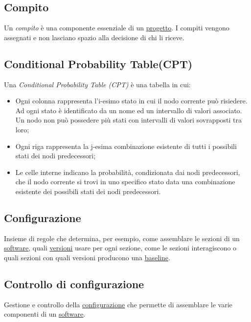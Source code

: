 	
	\subsection{Compito}
	\label{sec:compito}
	Un \emph{compito} è una componente essenziale di un \underline{\hyperref[sec:progetto]{progetto}}. I compiti vengono assegnati e non lasciano spazio alla decisione di chi li riceve.

	
	\subsection{Conditional Probability Table(CPT)}
	\label{sec:CPT}
	Una \emph{Conditional Probability Table (CPT)} è una tabella in cui:
		\begin{itemize}
			\item{Ogni colonna rappresenta l'i-esimo stato in cui il nodo corrente può risiedere. Ad ogni stato è identificato da un nome ed un intervallo di valori associato. Un nodo non può possedere più stati con intervalli di valori sovrapposti tra loro;}
			\item{Ogni riga rappresenta la j-esima combinazione esistente di tutti i possibili stati dei nodi predecessori;}
			\item{Le celle interne indicano la probabilità, condizionata dai nodi predecessori, che il nodo corrente si trovi in uno specifico stato data una combinazione esistente dei possibili stati dei nodi predecessori.}
		\end{itemize}

	
	\subsection{Configurazione}
	\label{sec:configurazione}
	Insieme di regole che determina, per esempio, come assemblare le sezioni di un \underline{\hyperref[sec:prodottosoftware]{software}}, quali \underline{\hyperref[sec:versione]{versioni}} usare per ogni sezione, come le sezioni interagiscono o quali sezioni con quali versioni producono una \underline{\hyperref[sec:baseline]{baseline}}.


	\subsection{Controllo di configurazione}
	\label{sec:controlloconfigurazione}
	Gestione e controllo della \underline{\hyperref[sec:configurazione]{configurazione}} che permette di assemblare le varie componenti di un \underline{\hyperref[sec:prodottosoftware]{software}}.


